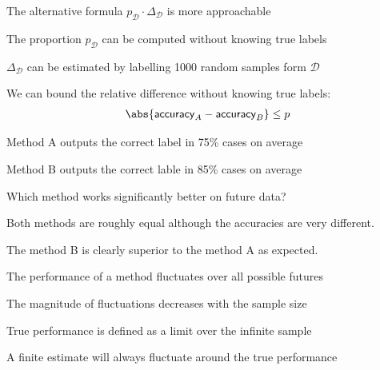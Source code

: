 \documentclass[landscape,footrule]{foils}
\begin{document}

The alternative formula $p_\mathcal{D}\cdot \Delta_\mathcal{D}$ is more approachable
\begin{triangles}
\item The proportion $p_\mathcal{D}$ can be computed without knowing true labels
\item $\Delta_\mathcal{D}$ can be estimated by labelling 1000 random samples form $\mathcal{D}$
\end{triangles}
\vspace*{1cm}

We can bound the relative difference without knowing true labels:
\begin{align*}
\abs{\mathsf{accuracy}_A-\mathsf{accuracy}_B}\leq p
\end{align*}



\begin{triangles}
\item Method A outputs the correct label in 75\% cases on average
\item Method B outputs the correct lable in 85\% cases on average
\item Which method works significantly better on future data? 
\end{triangles} 






Both methods are roughly equal although the accuracies are very different. 



The method B is clearly superior to the method A as expected. 


\begin{triangles}
\item The performance of a method fluctuates over all possible futures
\item The magnitude of fluctuations decreases with the sample size
\item True performance is defined as a limit over the infinite sample
\item A finite estimate will always fluctuate around the true performance
\end{triangles}
\vspace*{1.5cm}
\end{document}
